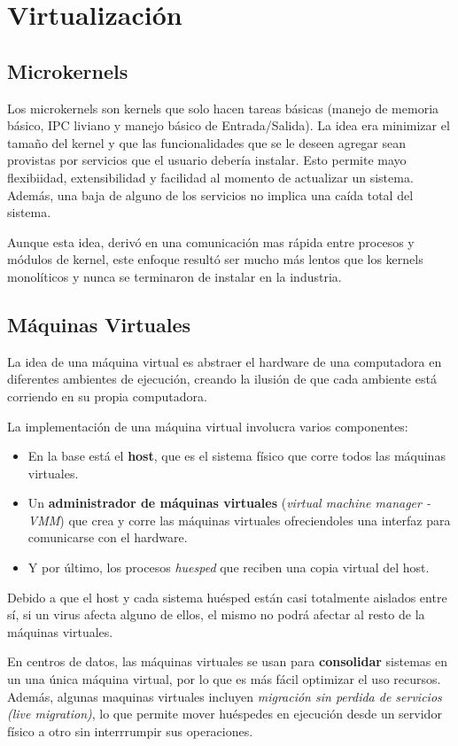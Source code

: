 \section{Virtualización}
\subsection{Microkernels}
Los microkernels son kernels que solo hacen tareas básicas (manejo de memoria básico, IPC liviano y manejo básico de Entrada/Salida). La idea era minimizar el tamaño del kernel y que las funcionalidades que se le deseen agregar sean provistas por servicios que el usuario debería instalar. Esto permite mayo flexibiidad, extensibilidad y facilidad al momento de actualizar un sistema. Además, una baja de alguno de los servicios no implica una caída total del sistema.

Aunque esta idea, derivó en una comunicación mas rápida entre procesos y módulos de kernel, este enfoque resultó ser mucho más lentos que los kernels monolíticos y nunca se terminaron de instalar en la industria.


\subsection{Máquinas Virtuales}
La idea de una máquina virtual es abstraer el hardware de una computadora en diferentes ambientes de ejecución, creando la ilusión de que cada ambiente está corriendo en su propia computadora.

La implementación de una máquina virtual involucra varios componentes:
\begin{itemize}
	\item En la base está el \textbf{host}, que es el sistema físico que corre todos las máquinas virtuales.
	\item Un \textbf{administrador de máquinas virtuales} (\textit{virtual machine manager - VMM}) que crea y corre las máquinas virtuales ofreciendoles una interfaz para comunicarse con el hardware.
	\item Y por último, los procesos \textit{huesped} que reciben una copia virtual del host.  
\end{itemize}

Debido a que el host y cada sistema huésped están casi totalmente aislados entre sí, si un virus afecta alguno de ellos, el mismo no podrá afectar al resto de la máquinas virtuales.

En centros de datos, las máquinas virtuales se usan para \textbf{consolidar} sistemas en un una única máquina virtual, por lo que es más fácil optimizar el uso recursos. Además, algunas maquinas virtuales incluyen \textit{migración sin perdida de servicios (live migration)}, lo que permite mover huéspedes en ejecución desde un servidor físico a otro sin interrrumpir sus operaciones. 
	
